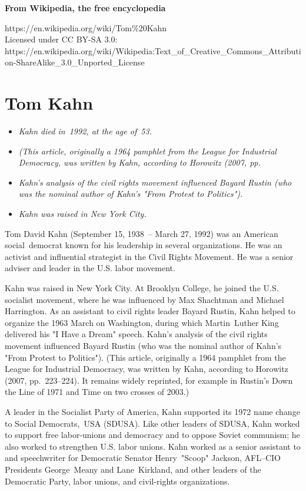 \textbf{From Wikipedia, the free encyclopedia}

https://en.wikipedia.org/wiki/Tom\%20Kahn\\
Licensed under CC BY-SA 3.0:\\
https://en.wikipedia.org/wiki/Wikipedia:Text\_of\_Creative\_Commons\_Attribution-ShareAlike\_3.0\_Unported\_License

\section{Tom Kahn}\label{tom-kahn}

\begin{itemize}
\item
  \emph{Kahn died in~1992, at the age of~53.}
\item
  \emph{(This article, originally a 1964 pamphlet from the League for
  Industrial Democracy, was written by Kahn, according to Horowitz
  (2007, pp.}
\item
  \emph{Kahn's analysis of the civil rights movement influenced Bayard
  Rustin (who was the nominal author of Kahn's "From Protest to
  Politics").}
\item
  \emph{Kahn was raised in New York City.}
\end{itemize}

Tom David Kahn (September 15, 1938~-- March 27, 1992) was an American
social~democrat known for his leadership in several organizations. He
was an activist and influential strategist in the Civil Rights Movement.
He was a senior adviser and leader in the U.S. labor movement.

Kahn was raised in New York City. At Brooklyn College, he joined the
U.S. socialist movement, where he was influenced by Max Shachtman and
Michael Harrington. As an assistant to civil rights leader Bayard
Rustin, Kahn helped to organize the 1963 March on Washington, during
which Martin~Luther King delivered his "I Have a Dream" speech. Kahn's
analysis of the civil rights movement influenced Bayard Rustin (who was
the nominal author of Kahn's "From Protest to Politics"). (This article,
originally a 1964 pamphlet from the League for Industrial Democracy, was
written by Kahn, according to Horowitz (2007, pp.~223--224). It remains
widely reprinted, for example in Rustin's Down the Line of 1971 and Time
on two crosses of 2003.)

A leader in the Socialist Party of America, Kahn supported its 1972 name
change to Social Democrats,~USA (SDUSA). Like other leaders of SDUSA,
Kahn worked to support free labor-unions and democracy and to oppose
Soviet communism; he also worked to strengthen U.S. labor unions. Kahn
worked as a senior assistant to and speechwriter for Democratic Senator
Henry~"Scoop" Jackson, AFL--CIO Presidents George~Meany and
Lane~Kirkland, and other leaders of the Democratic Party, labor unions,
and civil-rights organizations.

